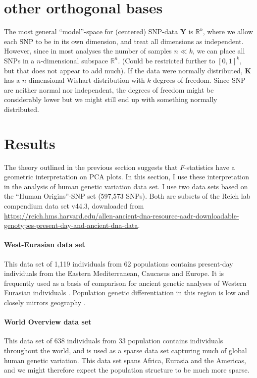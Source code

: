 \documentclass[10pt,a4paper]{article}
\newcommand{\MY}{\mathbf{Y}} %
\newcommand{\MK}{\mathbf{K}} %
\begin{document}
\section{other orthogonal bases}
The most general ``model''-space for (centered) SNP-data $\MY$ is $\mathbb{R}^k$, where we allow each SNP to be in its own dimension, and treat all dimensions as independent. However, since in most analyses the number of samples $n \ll k$, we can place all SNPs in a $n$-dimensional subspace $\mathbb{R}^n$. (Could be restricted further to $[0,1]^k$, but that does not appear to add much).
If the data were normally distributed, $\MK$ has a $n$-dimensional Wishart-distribution with $k$ degrees of freedom. Since SNP are neither normal nor independent, the degrees of freedom might be considerably lower but we might still end up with something normally distributed.



\section{Results}
The theory outlined in the previous section suggests that $F$-statistics have a geometric interpretation on PCA plots. In this section, I use these interpretation in the analysis of human genetic variation data set. I use two data sets based on the ``Human Origins''-SNP set (597,573 SNPs). Both are subsets of the Reich lab compendium data set v44.3, downloaded from \url{https://reich.hms.harvard.edu/allen-ancient-dna-resource-aadr-downloadable-genotypes-present-day-and-ancient-dna-data}. 

\paragraph{West-Eurasian data set}
This data set of 1,119 individuals from 62 populations contains  present-day individuals from the Eastern Mediterranean, Caucasus and Europe. It is frequently used as a basis of comparison for ancient genetic analyses of Western Eurasian individuals \cite{patterson2012}. Population genetic differentiation in this region is low and closely mirrors geography \cite{novembre2008}. 

\paragraph{World Overview data set}
This data set of 638 individuals from 33 population contains individuals throughout the world, and is used as a sparse data set capturing much of global human genetic variation. This data set spans Africa, Eurasia and the Americas, and we might therefore expect the population structure to be much more sparse.
\end{document}
